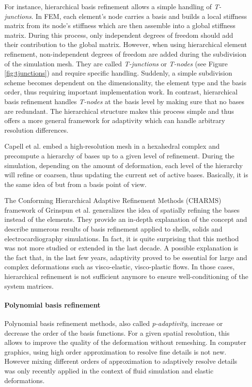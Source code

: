For instance, hierarchical basis refinement allows a simple handling of \emph{T-junctions}.
In FEM, each element's node carries a basis and builds a local stiffness matrix from its node's stiffness which are then assemble into a global stiffness matrix.
During this process, only independent degrees of freedom should add their contribution to the global matrix. However, when using hierarchical element refinement, non-independent degrees of freedom are added during the subdivision of the simulation mesh. They are called \emph{T-junctions} or \emph{T-nodes} (see Figure \ref{fig:tjunctions}) and require specific handling. Suddenly, a simple subdivision scheme becomes dependent on the dimensionality, the element type and the basis order, thus requiring important implementation work. In contrast, hierarchical basis refinement handles \emph{T-nodes} at the basis level by making sure that no bases are redundant. The hierarchical structure makes this process simple and thus offers a more general framework for adaptivity which can handle arbitrary resolution differences.

Capell et al. \cite{Capell2002} embed a high-resolution mesh in a hexahedral complex and precompute a hierarchy of bases up to a given level of refinement. During the simulation, depending on the amount of deformation, each level of the hierarchy will refine or coarsen, thus updating the current set of active bases. Basically, it is the same idea of \cite{Debunne2001} but from a basis point of view.

The Conforming Hierarchical Adaptive Refinement Methods (CHARMS) framework of Grinspun et al. \cite{Grinspun2002} generalizes the idea of spatially refining the bases instead of the elements. They provide an in-depth explanation of the concept and describe numerous results of basis refinement applied to shells, solids and electrocardiography simulations.
In fact, it is quite surprising that this method was not more studied or extended in the last decade. A possible explanation is the fact that, in the last few years, adaptivity proved to be essential for large and complex deformations such as visco-elastic, visco-plastic flows. In those cases, hierarchical refinement is not sufficient anymore to ensure well-conditioning of the system matrices. 

\paragraph*{Polynomial basis refinement}
Polynomial basis refinement methods, also called \emph{p-adaptivity}, increase or decrease the order of the basis functions.
For a given spatial resolution, this allows to improve the quality of the deformation without remeshing. In computer graphics, using high order approximation to resolve fine details is not new. However mixing different orders of approximation to adaptively resolve details was only recently applied in the context of fluid simulation and elastic deformations.

